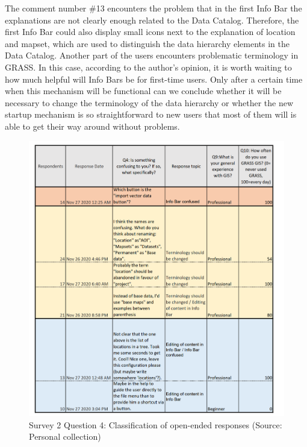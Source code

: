 \documentclass[a4paper,10pt,twoside]{article}
\begin{document}
\noindent The comment number \#13 encounters the problem that in the first Info Bar the explanations are not clearly enough related to the Data Catalog. Therefore, the first Info Bar could also display small icons next to the explanation of location and mapset, which are used to distinguish the data hierarchy elements in the Data Catalog. Another part of the users encounters problematic terminology in GRASS. In this case, according to the author's opinion, it is worth waiting to how much helpful will Info Bars be for first-time users. Only after a certain time when this mechanism will be functional can we conclude whether it will be necessary to change the terminology of the data hierarchy or whether the new startup mechanism is so straightforward to new users that most of them will is able to get their way around without problems.

\vspace{0.3cm}
\begin{figure}[hbt!] 
\begin{center}
\includegraphics[width=16cm]{../surveys/analyzed_data/survey2_question4.png} 
\caption[Survey 2 Question 4: Classification of open-ended responses]{Survey 2 Question 4: Classification of open-ended responses (Source: Personal collection)}
\label{fig:survey2_question4}
\end{center}
\end{figure}
\end{document}
